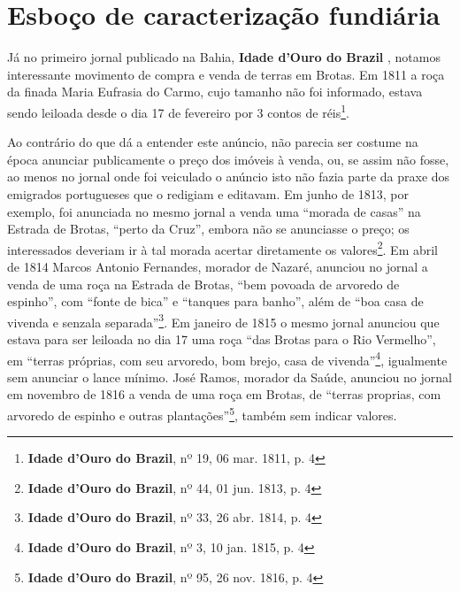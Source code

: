 \section{Esboço de caracterização fundiária}\label{sec:2.3}

Já no primeiro jornal publicado na Bahia, \textbf{Idade d'Ouro do Brazil} \cite[p.~162]{souza_imprensa_1972}, notamos interessante movimento de compra e venda de terras em Brotas. Em 1811 a roça da finada Maria Eufrasia do Carmo, cujo tamanho não foi informado, estava sendo leiloada desde o dia 17 de fevereiro por 3 contos de réis\footnote{\textbf{Idade d'Ouro do Brazil}, nº 19, 06 mar. 1811, p. 4}.

Ao contrário do que dá a entender este anúncio, não parecia ser costume na época anunciar publicamente o preço dos imóveis à venda, ou, se assim não fosse, ao menos no jornal onde foi veiculado o anúncio isto não fazia parte da praxe dos emigrados portugueses que o redigiam e editavam. Em junho de 1813, por exemplo, foi anunciada no mesmo jornal a venda uma ``morada de casas'' na Estrada de Brotas, ``perto da Cruz'', embora não se anunciasse o preço; os interessados deveriam ir à tal morada acertar diretamente os valores\footnote{\textbf{Idade d'Ouro do Brazil}, nº 44, 01 jun. 1813, p. 4}. Em abril de 1814 Marcos Antonio Fernandes, morador de Nazaré, anunciou no jornal a venda de uma roça na Estrada de Brotas, ``bem povoada de arvoredo de espinho'', com ``fonte de bica'' e ``tanques para banho'', além de ``boa casa de vivenda e senzala separada''\footnote{\textbf{Idade d'Ouro do Brazil}, nº 33, 26 abr. 1814, p. 4}. Em janeiro de 1815 o mesmo jornal anunciou que estava para ser leiloada no dia 17 uma roça ``das Brotas para o Rio Vermelho'', em ``terras próprias, com seu arvoredo, bom brejo, casa de vivenda''\footnote{\textbf{Idade d'Ouro do Brazil}, nº 3, 10 jan. 1815, p. 4}, igualmente sem anunciar o lance mínimo. José Ramos, morador da Saúde, anunciou no jornal em novembro de 1816 a venda de uma roça em Brotas, de ``terras proprias, com arvoredo de espinho e outras plantações''\footnote{\textbf{Idade d'Ouro do Brazil}, nº 95, 26 nov. 1816, p. 4}, também sem indicar valores. 

